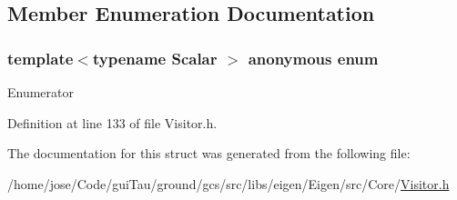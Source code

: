 \subsection{Member Enumeration Documentation}
\hypertarget{structei__functor__traits_3_01ei__min__coeff__visitor_3_01_scalar_01_4_01_4_a2cae70a7c1420820eec471516284b3eb}{\subsubsection[{anonymous enum}]{\setlength{\rightskip}{0pt plus 5cm}template$<$typename Scalar $>$ anonymous enum}}\label{structei__functor__traits_3_01ei__min__coeff__visitor_3_01_scalar_01_4_01_4_a2cae70a7c1420820eec471516284b3eb}
\begin{Desc}
\item[Enumerator]\par
\begin{description}
\item[{\em 
\hypertarget{structei__functor__traits_3_01ei__min__coeff__visitor_3_01_scalar_01_4_01_4_a2cae70a7c1420820eec471516284b3eba5445646f5b30086fe41893963b075e42}{Cost}\label{structei__functor__traits_3_01ei__min__coeff__visitor_3_01_scalar_01_4_01_4_a2cae70a7c1420820eec471516284b3eba5445646f5b30086fe41893963b075e42}
}]\end{description}
\end{Desc}


Definition at line 133 of file Visitor.\-h.



The documentation for this struct was generated from the following file\-:\begin{DoxyCompactItemize}
\item 
/home/jose/\-Code/gui\-Tau/ground/gcs/src/libs/eigen/\-Eigen/src/\-Core/\hyperlink{_visitor_8h}{Visitor.\-h}\end{DoxyCompactItemize}

